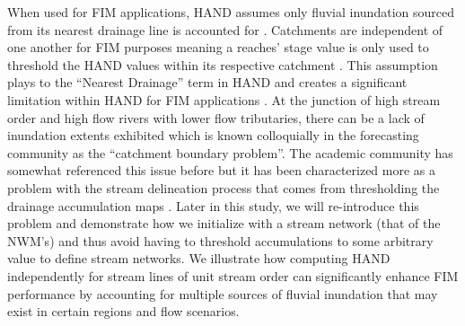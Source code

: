 \documentclass[draft]{dependencies/agujournal2019}
\begin{document}
When used for FIM applications, HAND assumes only fluvial inundation sourced from its nearest drainage line is accounted for \cite{nobre2016hand,mcgehee2016modified}.
Catchments are independent of one another for FIM purposes meaning a reaches' stage value is only used to threshold the HAND values within its respective catchment \cite{liu2016cybergis,zheng2018river,zheng2018geoflood}.
This assumption plays to the ``Nearest Drainage'' term in HAND and creates a significant limitation within HAND for FIM applications \cite{zhang2018comparative,mcgehee2016modified,li2020evaluation,nobre2016hand}.
At the junction of high stream order and high flow rivers with lower flow tributaries, there can be a lack of inundation extents exhibited which is known colloquially in the forecasting community as the ``catchment boundary problem''.
The academic community has somewhat referenced this issue before but it has been characterized more as a problem with the stream delineation process that comes from thresholding the drainage accumulation maps \cite{nobre2016hand,li2020evaluation}.
Later in this study, we will re-introduce this problem and demonstrate how we initialize with a stream network (that of the NWM's) and thus avoid having to threshold accumulations to some arbitrary value to define stream networks.
We illustrate how computing HAND independently for stream lines of unit stream order can significantly enhance FIM performance by accounting for multiple sources of fluvial inundation that may exist in certain regions and flow scenarios.
%
\end{document}
